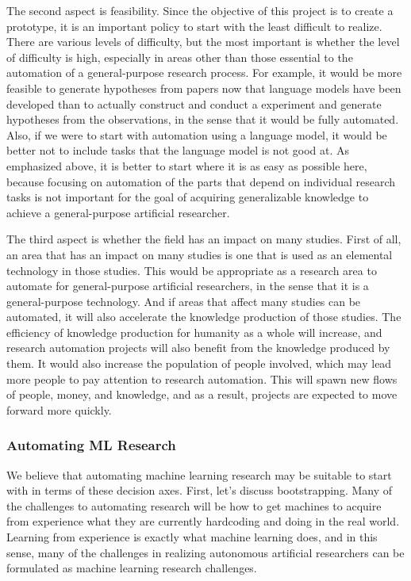 The second aspect is feasibility. Since the objective of this project is to create a prototype, it is an important policy to start with the least difficult to realize. There are various levels of difficulty, but the most important is whether the level of difficulty is high, especially in areas other than those essential to the automation of a general-purpose research process. For example, it would be more feasible to generate hypotheses from papers now that language models have been developed than to actually construct and conduct a experiment and generate hypotheses from the observations, in the sense that it would be fully automated. Also, if we were to start with automation using a language model, it would be better not to include tasks that the language model is not good at. As emphasized above, it is better to start where it is as easy as possible here, because focusing on automation of the parts that depend on individual research tasks is not important for the goal of acquiring generalizable knowledge to achieve a general-purpose artificial researcher.

The third aspect is whether the field has an impact on many studies. First of all, an area that has an impact on many studies is one that is used as an elemental technology in those studies. This would be appropriate as a research area to automate for general-purpose artificial researchers, in the sense that it is a general-purpose technology. And if areas that affect many studies can be automated, it will also accelerate the knowledge production of those studies. The efficiency of knowledge production for humanity as a whole will increase, and research automation projects will also benefit from the knowledge produced by them. It would also increase the population of people involved, which may lead more people to pay attention to research automation. This will spawn new flows of people, money, and knowledge, and as a result, projects are expected to move forward more quickly.

\subsubsection{Automating ML Research}
We believe that automating machine learning research may be suitable to start with in terms of these decision axes. First, let's discuss bootstrapping. Many of the challenges to automating research will be how to get machines to acquire from experience what they are currently hardcoding and doing in the real world. Learning from experience is exactly what machine learning does, and in this sense, many of the challenges in realizing autonomous artificial researchers can be formulated as machine learning research challenges.

